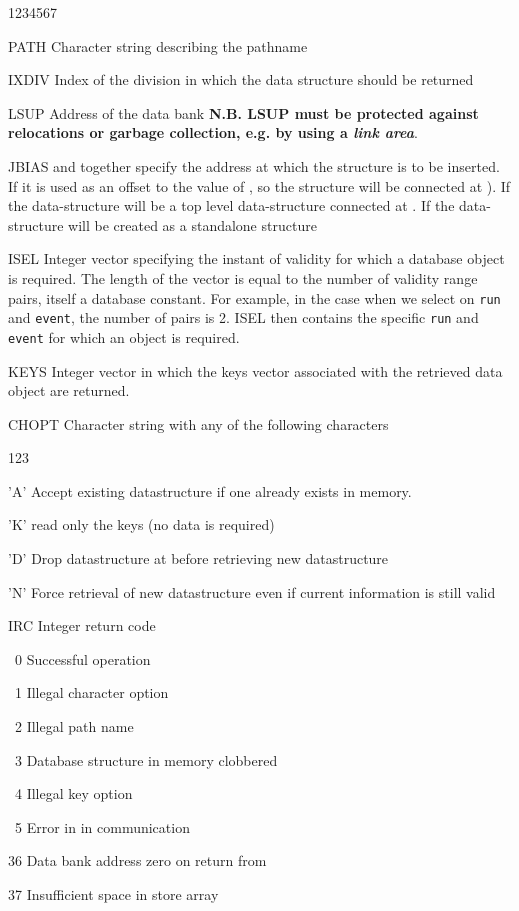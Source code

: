\begin{DLtt}{1234567}
\item[PATH]Character string describing the pathname
\item[IXDIV]Index of the division in which the data structure
should be returned
\item[LSUP]Address of the data bank
  {\bf N.B. LSUP must be protected against relocations or garbage
collection, e.g. by using a {\it link area}}.
\item[JBIAS] and 
  together specify the address at  which the
  structure is to be inserted.
  If  it is used as an
  offset to the value of , so the structure will be connected
  at ).
  If  the data-structure will be a
  top level data-structure connected at .
  If  the
  data-structure will be created as a standalone structure
\item[ISEL]Integer vector specifying the instant of validity
for which a database object is required. The length of the vector
is equal to the number of validity range pairs, itself a database constant.
For example, in the case when we select on {\tt run} and {\tt event},
the number of pairs is 2. ISEL then contains the specific {\tt run}
and {\tt event} for which an object is required.
\item[KEYS]Integer vector in which the keys vector associated
with the retrieved data object are returned.
\item[CHOPT]Character string with any of the following characters
  \begin{DLtt}{123}
    \item['A']Accept existing datastructure if one already exists in memory.
    \item['K']read only the keys (no data is required)
    \item['D']Drop datastructure at  before retrieving new datastructure
    \item['N']Force retrieval of new datastructure even if current information
    is still valid
  \end{DLtt}
\item[IRC]Integer return code
  \begin{DLtt}{12}
    \item[\ 0] Successful operation
    \item[\ 1]Illegal character option
    \item[\ 2]Illegal path name
    \item[\ 3]Database structure in memory clobbered
    \item[\ 4]Illegal key option
    \item[\ 5]Error in  in  communication
    \item[36]Data bank address zero on return from 
    \item[37]Insufficient space in  store array
  \end{DLtt}
\end{DLtt}

